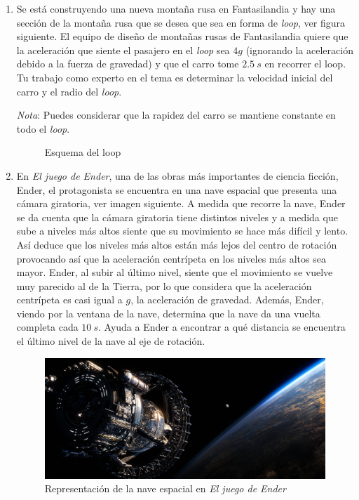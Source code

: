 \documentclass[letterpaper]{article}
\begin{document}
\begin{enumerate}

\item Se está construyendo una nueva montaña rusa en Fantasilandia y hay una sección de la montaña rusa que se desea que sea en forma de \emph{loop}, ver figura siguiente. El equipo de diseño de montañas rusas de Fantasilandia quiere que la aceleración que siente el pasajero en el \emph{loop} sea $4g$ (ignorando la aceleración debido a la fuerza de gravedad) y que el carro tome $2.5\ \si{s}$ en recorrer el loop. Tu trabajo como experto en el tema es determinar la velocidad inicial del carro y el radio del \emph{loop}.
 
\emph{Nota}: Puedes considerar que la rapidez del carro se mantiene constante en todo el \emph{loop}.

\begin{figure}[h]
\centering
{}
\caption{Esquema del loop}
\end{figure}
 
\item En \emph{El juego de Ender}, una de las obras más importantes de ciencia ficción, Ender, el protagonista se encuentra en una nave espacial que presenta una cámara giratoria, ver imagen siguiente. A medida que recorre la nave, Ender se da cuenta que la cámara giratoria tiene distintos niveles y a medida que sube a niveles más altos siente que su movimiento se hace más difícil y lento.  Así deduce que los niveles más altos están más lejos del centro de rotación provocando así que la aceleración centrípeta en los niveles más altos sea mayor. Ender, al subir al último nivel, siente que el movimiento se vuelve muy parecido al de la Tierra, por lo que considera que la aceleración centrípeta es casi igual a $g$, la aceleración de gravedad. Además, Ender, viendo por la ventana de la nave, determina que la nave da una vuelta completa cada $10\ \si{s}$. Ayuda a Ender a encontrar a qué distancia se encuentra el último nivel de la nave al eje de rotación.

\begin{figure}[h]
\centering
\includegraphics[scale=0.4]{ender.jpg}
\caption{Representación de la nave espacial en \emph{El juego de Ender}}
\end{figure}

\end{enumerate}
\end{document}
